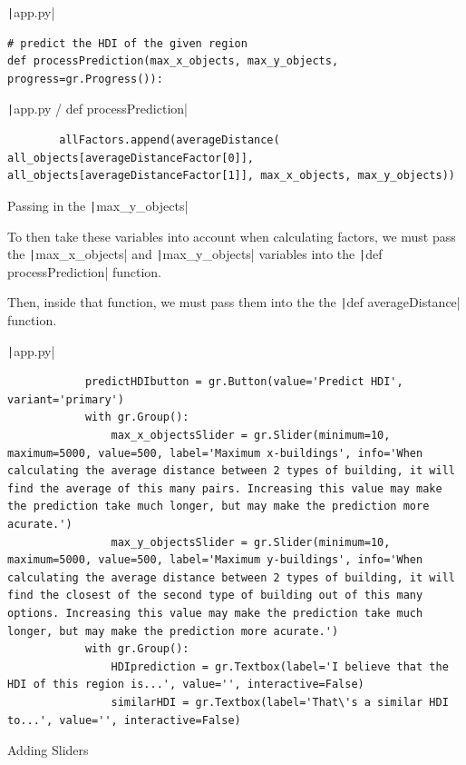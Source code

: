 \documentclass[12pt]{report}
\newcommand{\pil}[1]{\protect\texttt|#1|}
\begin{document}
\begin{listing}[H]
\pil{app.py}
\begin{verbatim}
# predict the HDI of the given region
def processPrediction(max_x_objects, max_y_objects, progress=gr.Progress()):
\end{verbatim}
\pil{app.py / def processPrediction}
\begin{verbatim}
        allFactors.append(averageDistance( all_objects[averageDistanceFactor[0]], all_objects[averageDistanceFactor[1]], max_x_objects, max_y_objects))
\end{verbatim}
\caption{Passing in the \pil{max_y_objects}}\label{cs:passingMaxYobjects}
\end{listing}

To then take these variables into account when calculating factors, we must pass the \pil{max_x_objects} and \pil{max_y_objects} variables into the \pil{def processPrediction} function.

Then, inside that function, we must pass them into the the \pil{def averageDistance} function.

\begin{listing}[H]
\pil{app.py}
\begin{verbatim}
            predictHDIbutton = gr.Button(value='Predict HDI', variant='primary')
            with gr.Group():
                max_x_objectsSlider = gr.Slider(minimum=10, maximum=5000, value=500, label='Maximum x-buildings', info='When calculating the average distance between 2 types of building, it will find the average of this many pairs. Increasing this value may make the prediction take much longer, but may make the prediction more acurate.')
                max_y_objectsSlider = gr.Slider(minimum=10, maximum=5000, value=500, label='Maximum y-buildings', info='When calculating the average distance between 2 types of building, it will find the closest of the second type of building out of this many options. Increasing this value may make the prediction take much longer, but may make the prediction more acurate.')
            with gr.Group():
                HDIprediction = gr.Textbox(label='I believe that the HDI of this region is...', value='', interactive=False)
                similarHDI = gr.Textbox(label='That\'s a similar HDI to...', value='', interactive=False)
\end{verbatim}
\caption{Adding Sliders}\label{cs:addSliders}
\end{listing}
\end{document}
